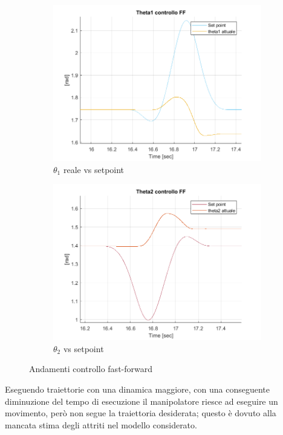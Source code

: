 \begin{figure}
\begin{subfigure}{.5\textwidth}
  \centering
  \includegraphics[width=.8\linewidth]{Immagini/Traiettorie/theta1FF}  
  \caption{$\theta_1$ reale vs setpoint}
  \label{fig:sub-ff1}
\end{subfigure}
\begin{subfigure}{.5\textwidth}
  \centering
  \includegraphics[width=.8\linewidth]{Immagini/Traiettorie/theta2FF}  
  \caption{$\theta_2$ vs setpoint}
  \label{fig:sub-ff2}
\end{subfigure}
\caption{Andamenti controllo fast-forward}
\label{fig:FFcoppie}
\end{figure}
Eseguendo traiettorie con una dinamica maggiore, con una conseguente diminuzione del tempo di esecuzione il manipolatore riesce ad eseguire un movimento, però non segue la traiettoria desiderata; questo è dovuto alla mancata stima degli attriti nel modello considerato.
